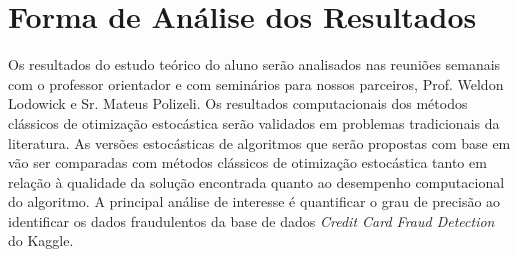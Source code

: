 \documentclass[a4paper,12pt]{article}
\begin{document}
\section{Forma de Análise dos Resultados}
Os resultados do estudo teórico do aluno serão analisados nas reuniões semanais com o professor orientador e com seminários para nossos parceiros, Prof. Weldon Lodowick e Sr. Mateus Polizeli. Os resultados computacionais dos métodos clássicos de otimização estocástica serão validados em problemas tradicionais da literatura. 
As versões estocásticas de algoritmos que serão propostas com base em \cite{bmLS} vão ser comparadas com métodos clássicos de otimização estocástica tanto em relação à qualidade da solução encontrada quanto ao desempenho computacional do algoritmo.   A principal análise de interesse é quantificar o grau de precisão ao identificar  os dados fraudulentos da base de dados \textit{Credit Card Fraud Detection} do  Kaggle.


%
% 
% 
\printbibliography
\end{document}
